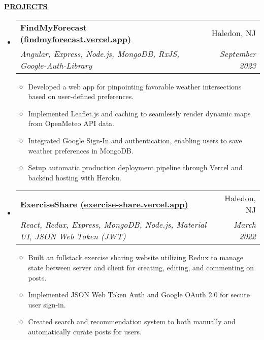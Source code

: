 \documentclass[letterpaper,11pt]{article}
\makeatletter
\newcommand{\resheading}[1]{{{\begin{minipage}{\textwidth}{\textbf{#1 \vphantom{p\^{E}}}}\end{minipage}}}}
\newcommand{\ressubheading}[4]{
\begin{tabular*}{7.3in}{l@{\extracolsep{\fill}}r}
		\textbf{#1} & #2 \\
		\textit{#3} & \textit{#4} \\
\end{tabular*}}
\makeatother
\begin{document}
\begin{spacing}{1.2}
\begin{itemize}[leftmargin=*]
\end{itemize}
\vspace{-0.0in}

\resheading{\hspace{0em}\uline{\textsc{PROJECTS}\hfill}}
\vspace{-0.2in}

\begin{itemize}[leftmargin=*]

\item[\raisebox{0.5\baselineskip}{\textbullet}]
	\ressubheading{FindMyForecast \href{https://findmyforecast.vercel.app}{(findmyforecast.vercel.app)}}{Haledon, NJ}{Angular, Express, Node.js, MongoDB, RxJS, Google-Auth-Library}{September 2023}
	\vspace{-0.05in}
	\begin{itemize}[leftmargin=*]
	\setlength\itemsep{0.1em}
		\item{Developed a web app for pinpointing favorable weather intersections based on user-defined preferences.}
		\item{Implemented Leaflet.js and caching to seamlessly render dynamic maps from OpenMeteo API data.}
		\item{Integrated Google Sign-In and authentication, enabling users to save weather preferences in MongoDB.}
            \item{Setup automatic production deployment pipeline through Vercel and backend hosting with Heroku.}
	\end{itemize}

\item[\raisebox{0.5\baselineskip}{\textbullet}]
	\ressubheading{ExerciseShare \href{https://exercise-share.vercel.app}{(exercise-share.vercel.app)}}{Haledon, NJ}{React, Redux, Express, MongoDB, Node.js, Material UI, JSON Web Token (JWT)}{March 2022}
	\vspace{-0.05in}
	\begin{itemize}[leftmargin=*]
	\setlength\itemsep{0.1em}
		\item{Built an fullstack exercise sharing website utilizing Redux to manage state between server and client for creating, editing, and commenting on posts.}
		\item{Implemented JSON Web Token Auth and Google OAuth 2.0 for secure user sign-in. }
		\item{Created search and recommendation system to both manually and automatically curate posts for users.}
		
	\end{itemize}
	

\end{itemize}
\end{spacing}
\end{document}
